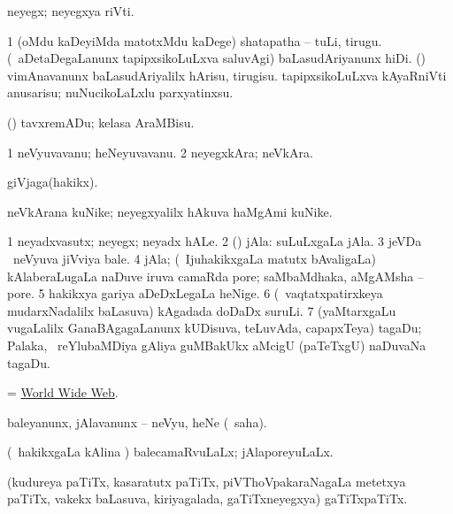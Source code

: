 \bentry
{} 
\gl{\nA}
\expl{}
\bmng
neyegx; neyegxya riVti. 
\emng
\eentry

\bentry
{} 
\gl{\akirx}
\expl{}
\bmng
\bnum
\num{1} (oMdu kaDeyiMda matotxMdu kaDege) shatapatha -- tuLi, tirugu. 
 (\kanmu\ aDetaDegaLanunx tapipxsikoLuLxva saluvAgi) baLasudAriyanunx hiDi. (\AmA) 
\banum
{} vimAnavanunx baLasudAriyalilx hArisu, tirugisu. 
 tapipxsikoLuLxva kAyaRniVti anusarisu; nuNucikoLaLxlu parxyatinxsu. 
\eanum
\numie
\enum
\emng

\noindent 
\gl{\pagu}
\expl{}
\bmng
{} (\ashi) tavxremADu; kelasa AraMBisu. 
\emng
\eentry

\bentry
{} 
\gl{\nA}
\expl{}
\bmng
\bnum
\num{1} neVyuvavanu; heNeyuvavanu. 
\num{2} neyegxkAra; neVkAra. 
\enum
\emng
\eentry

\bentry
{} 
\gl{\nA}
\expl{}
\bmng
giVjaga(hakikx). 
\emng
\eentry

\bentry
{} 
\gl{\nA}
\expl{}
\bmng
neVkArana kuNike; neyegxyalilx hAkuva haMgAmi kuNike. 
\emng
\eentry

\bentry
{} 
\gl{\nA}
\expl{}
\bmng
\bnum
\num{1} neyadxvasutx; neyegx; neyadx hALe. 
\num{2} (\rUpa) jAla:  suLuLxgaLa jAla. 
\num{3} jeVDa \mo\ neVyuva jiVviya bale. 
\num{4} jAla; (\kanmu\ IjuhakikxgaLa matutx bAvaligaLa) kAlaberaLugaLa naDuve iruva camaRda pore; saMbaMdhaka, aMgAMsha -- pore. 
\num{5} hakikxya gariya aDeDxLegaLa heNige. 
\num{6} (\kanmu\ vaqtatxpatirxkeya mudarxNadalilx baLasuva) kAgadada doDaDx suruLi. 
\num{7} (yaMtarxgaLu \mo vugaLalilx GanaBAgagaLanunx kUDisuva, teLuvAda, capapxTeya) tagaDu; Palaka, \udA\ reYlubaMDiya gAliya guMBakUkx aMcigU (paTeTxgU) naDuvaNa tagaDu. 
\enum
\emng

\noindent 
\gl{\pagu}
\expl{}
\bmng
{} = \hyperlink{world wide web}{World Wide Web}. 
\emng
\eentry

\bentry
{} 
\gl{\sakirx}
\bmng
baleyanunx, jAlavanunx -- neVyu, heNe (\akirx\ saha). 
\emng
\eentry

\bentry
{} 
\gl{\gu}
\expl{}
\bmng
(\kanmu\ hakikxgaLa kAlina \vi) balecamaRvuLaLx; jAlaporeyuLaLx. 
\emng
\eentry

\bentry
{} 
\gl{\nA}
\expl{}
\bmng
(kudureya paTiTx, kasaratutx paTiTx, piVThoVpakaraNagaLa metetxya paTiTx, \mo vakekx baLasuva, kiriyagalada, gaTiTxneyegxya) gaTiTxpaTiTx. 
\emng
\eentry

